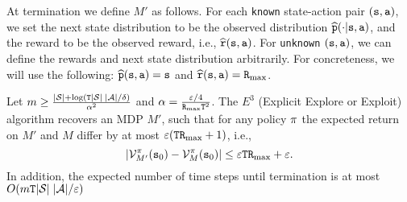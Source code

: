At termination we define $M'$ as follows. For each \texttt{known} state-action pair
$({\tt s},{\tt a})$, we set the next state distribution to be the
observed distribution $\widehat{{\tt p}}(\cdot|{\tt s},{\tt a})$, and the
reward to be the observed reward, i.e.,
$\widehat{{\tt r}}({\tt s},{\tt a})$.
%
For \texttt{unknown} $({\tt s},{\tt a})$, we can define the rewards and next
state distribution arbitrarily. For concreteness, we will use the
following: $\widehat{{\tt p}}({\tt s},{\tt a})={\tt s}$ and
$\widehat{{\tt r}}({\tt s},{\tt a})={\tt R}_{\max }$.

\begin{theorem}
\label{thm:MBRL:EEE}
Let $m\geq
\frac{|\mathcal{S}|+\log({\tt T}|\mathcal{S}|\;|\mathcal{A}|/\delta)}{\alpha^2}$
and $\alpha=\frac{\varepsilon/4}{{\tt R}_{\max } {\tt T}^2}$.
%
The $E^3$ (Explicit Explore or Exploit) algorithm recovers an MDP
$M'$, such that for any policy $\pi$ the expected return on $M'$
and $M$ differ by at most $\varepsilon({\tt T}{\tt R}_{\max }+1)$, i.e.,
$$|\mathcal{V}^\pi_{M'}({\tt s}_0)-\mathcal{V}^\pi_M({\tt s}_0) |\leq
\varepsilon{\tt T}{\tt R}_{\max }+\varepsilon. $$
 In addition, the expected number of time
steps until termination is at most $O(m{\tt T}
|\mathcal{S}|\;|\mathcal{A}|/\varepsilon)$
\end{theorem}

